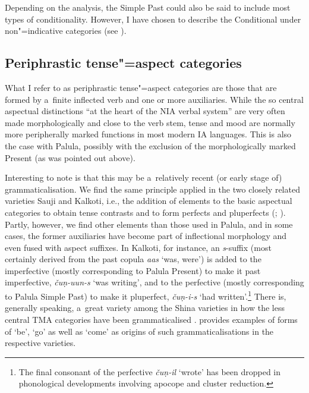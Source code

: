 Depending on the analysis, the Simple Past could also be said to include most types of conditionality. However, I have chosen to describe the Conditional under non"=indicative categories (see ).


\subsection{Periphrastic tense"=aspect categories}
\label{subsec:9-1-5}

What I refer to as periphrastic tense"=aspect categories are those that are formed by a~finite inflected verb and one or more auxiliaries. While the so central aspectual distinctions ``at the heart of the NIA verbal system'' \citep[262]{masica1991} are very often made morphologically and close to the verb stem, tense and mood are normally more peripherally marked functions in most modern IA languages. This is also the case with Palula, possibly with the exclusion of the morphologically marked Present (as was pointed out above). 



Interesting to note is that this may be a~relatively recent (or early stage of) grammaticalisation. We find the same principle applied in the two closely related varieties Sauji and Kalkoti, i.e., the addition of elements to the basic aspectual categories to obtain tense contrasts and to form perfects and pluperfects (\citealt[48--55]{buddruss1967}; \citealt[48--53]{liljegren2009}). Partly, however, we find other elements than those used in Palula, and in some cases, the former auxiliaries have become part of inflectional morphology and even fused with aspect suffixes. In Kalkoti, for instance, an \textit{s}-suffix (most certainly derived from the past copula \textit{aas} `was, were') is added to the imperfective (mostly corresponding to Palula Present) to make it past imperfective, \textit{čuṇ-uun-s} `was writing', and to the perfective (mostly corresponding to Palula Simple Past) to make it pluperfect, \textit{čuṇ-i-s} `had written'.\footnote{The final consonant of the perfective \textit{čuṇ-il} `wrote' has been dropped in phonological developments involving apocope and cluster reduction.} There is, generally speaking, a~great variety among the Shina varieties in how the less central TMA categories have been grammaticalised \citep[144--156]{liljegren2013}. \citet[38]{schmidt2004} provides examples of forms of `be', `go' as well as `come' as origins of such grammaticalisations in the respective varieties. 



